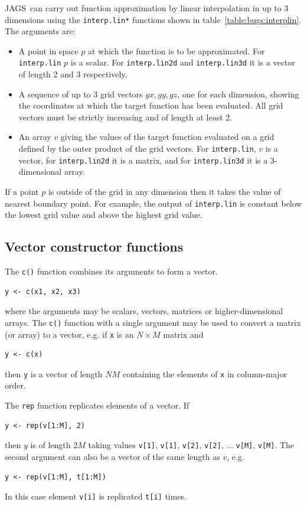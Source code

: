 \documentclass[11pt, a4paper, titlepage]{report}
\newcommand{\JAGS}{\textsf{JAGS}}
\begin{document}
\JAGS\ can carry out function approximation by linear interpolation in
up to 3 dimensions using the \texttt{interp.lin*} functions shown in
table~\ref{table:bugs:interplin}. The arguments are:
\begin{itemize}
\item A point in space $p$ at which the function is to be
  approximated. For \texttt{interp.lin} $p$ is a scalar. For
  \texttt{interp.lin2d} and \texttt{interp.lin3d} it is a vector of
  length 2 and 3 respectively.
\item A sequence of up to 3 grid vectors $gx,gy,gz$, one for each
  dimension, showing the coordinates at which the target function has
  been evaluated. All grid vectors must be strictly increasing and of
  length at least 2.
\item An array $v$ giving the values of the target function evaluated
  on a grid defined by the outer product of the grid vectors. For
  \texttt{interp.lin}, $v$ is a vector, for \texttt{interp.lin2d} it
  is a matrix, and for \texttt{interp.lin3d} it is a 3-dimensional
  array.
\end{itemize}
If a point $p$ is outside of the grid in any dimension then it takes
the value of nearest boundary point.  For example, the output of
\texttt{interp.lin} is constant below the lowest grid value and above
the highest grid value.

\subsection{Vector constructor functions}

The \verb+c()+ function combines its arguments to form a vector.
\begin{verbatim}
y <- c(x1, x2, x3)
\end{verbatim}
where the arguments may be scalars, vectors, matrices or
higher-dimensional arrays. The \verb+c()+ function with a single
argument may be used to convert a matrix (or array) to a vector, e.g.
if \texttt{x} is an $N \times M$ matrix and
\begin{verbatim}
y <- c(x)
\end{verbatim}
then \texttt{y} is a vector of length $NM$ containing the elements of
\texttt{x} in column-major order.

The \texttt{rep} function replicates elements of a vector. If
\begin{verbatim}
y <- rep(v[1:M], 2)
\end{verbatim}
then $y$ is of length $2M$ taking values \verb+v[1]+, \verb+v[1]+,
\verb+v[2]+, \verb+v[2]+, $\ldots$ \verb+v[M]+, \verb+v[M]+.
The second argument can also be a vector of the same length as $v$,
e.g.
\begin{verbatim}
y <- rep(v[1:M], t[1:M])
\end{verbatim}
In this case element \verb+v[i]+ is replicated \verb+t[i]+ times.
\end{document}
